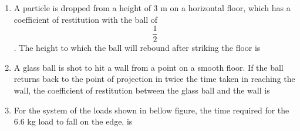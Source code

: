 \documentclass[11pt,a4paper]{article}
\begin{document}
\begin{enumerate}
\item{A particle is dropped from a height of 3 m on a horizontal floor, which has a coefficient of restitution with the ball of $$\frac{1}{2}$$. The height to which the ball will rebound after striking the floor is}
\\
\item{A glass ball is shot to hit a wall from a point on a smooth floor. If the ball returns back to the point of projection in twice the time taken in reaching the wall, the coefficient of restitution between the glass ball and the wall is}
\\
\item{For the system of the loads shown in bellow figure, the time required for the 6.6 kg load to fall on the edge, is \\

}
\end{enumerate}
\end{document}
